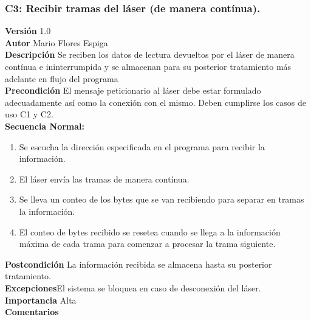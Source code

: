  \subsubsection{ C3: Recibir tramas del láser (de manera contínua).}
\textbf{Versión} 1.0\\
\textbf{Autor} Mario Flores Espiga\\
\textbf{Descripción} Se reciben los datos de lectura devueltos por el láser de manera contínua e ininterrumpida y se almacenan para su posterior tratamiento más adelante en flujo del programa\\
\textbf{Precondición} El mensaje peticionario al láser debe estar formulado adecuadamente así como la conexión con el mismo. Deben cumplirse los casos de uso C1 y C2.\\
\textbf{Secuencia Normal:} 
\begin{enumerate}
	\item Se escucha la dirección especificada en el programa para recibir la información.
	\item El láser envía las tramas de manera contínua.
	\item Se lleva un conteo de los bytes que se van recibiendo para separar en tramas la información.
	\item El conteo de bytes recibido se resetea cuando se llega a la información máxima de cada trama para comenzar a procesar la trama siguiente.

\end{enumerate}
\textbf{Postcondición} La información recibida se almacena hasta su posterior tratamiento.\\
\textbf{Excepciones}El sistema se bloquea en caso de desconexión del láser.\\
\textbf{Importancia} Alta\\
\textbf{Comentarios}


